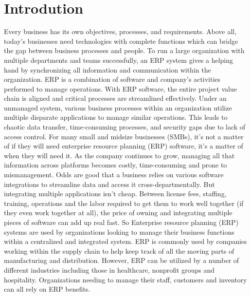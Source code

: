 \chapter{Introdution}
Every business has its own objectives, processes, and requirements. Above all, today’s 
businesses need technologies with complete functions which can bridge the gap between business 
processes and people. To run a large organization with multiple departments and teams successfully, 
an ERP system gives a helping hand by synchronizing all information and communication within the organization. 
ERP is a combination of software and company’s activities performed to manage operations. With ERP software, 
the entire project value chain is aligned and critical processes are streamlined effectively. \newline \newline
Under an unmanaged system, various business processes within an organization utilize multiple disparate 
applications to manage similar operations. This leads to chaotic data transfer, time-consuming processes, and 
security gaps due to lack of access control. \newline \newline
For many small and midsize businesses (SMBs), it’s not a matter of if they will need enterprise resource 
planning (ERP) software, it’s a matter of when they will need it. As the company continues to grow, 
managing all that information across platforms becomes costly, time-consuming and prone to mismanagement. \newline \newline
Odds are good that a business relies on various software integrations to streamline data and access it cross-departmentally. 
But integrating multiple applications isn’t cheap. \newline \newline
Between license fees, staffing, training, operations and the labor required to get them to work well 
together (if they even work together at all), the price of owning and integrating multiple pieces of 
software can add up real fast. \newline \newline
So Enterprise resource planning (ERP) systems are used by organizations looking to manage 
their business functions within a centralized and integrated system. ERP is commonly used by 
companies working within the supply chain to help keep track of all the moving parts of manufacturing 
and distribution. However, ERP can be utilized by a number of different industries including those in 
healthcare, nonprofit groups and hospitality. Organizations needing to manage their 
staff, customers and inventory can all rely on ERP benefits.


